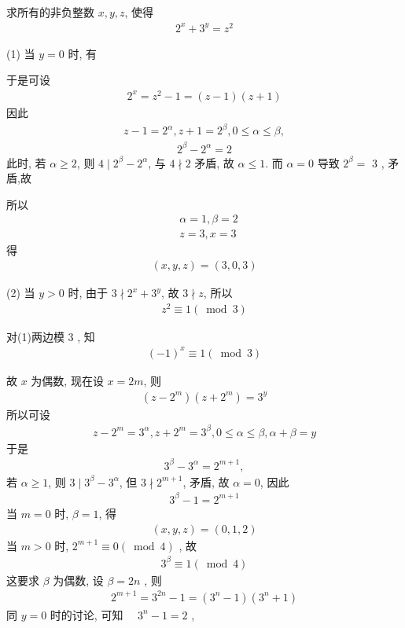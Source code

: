 \begin{example}
	求所有的非负整数 $x ,  y ,  z$, 使得
	\begin{align*}
		2^{x}+3^{y}=z^{2}
	\end{align*}
\end{example}
\begin{solution}
	(1) 当 $y=0$ 时, 有

	于是可设
	\begin{align*}
		2^{x}=z^{2}-1=(z-1)(z+1)
	\end{align*}
	因此
	\begin{align*}
		z-1=2^{\alpha}, z+1=2^{\beta}, 0 \leqslant \alpha \leqslant \beta,
	\end{align*}
	\begin{align*}
		2^{\beta}-2^{\alpha}=2
	\end{align*}
	此时, 若 $\alpha \geqslant 2$, 则 $4 \mid 2^{\beta}-2^{\alpha}$, 与 $4 \nmid 2$ 矛盾, 故 $\alpha \leqslant 1$. 而 $\alpha=0$ 导致 $2^{\beta}=$ 3 , 矛盾,故

	所以
	\begin{align}
		 & \alpha=1, \beta=2 \\
		 & z=3, x=3
	\end{align}
	得
	\begin{align*}
		(x, y, z)=(3,0,3)
	\end{align*}

	(2) 当 $y>0$ 时, 由于 $3 \nmid 2^{x}+3^{y}$, 故 $3 \nmid z$, 所以
	\begin{align*}
		z^{2} \equiv 1(\bmod 3)
	\end{align*}

	对(1)两边模 3 , 知
	\begin{align*}
		(-1)^{x} \equiv 1(\bmod 3)
	\end{align*}

	故 $x$ 为偶数, 现在设 $x=2 m$, 则
	\begin{align*}
		\left(z-2^{m}\right)\left(z+2^{m}\right)=3^{y}
	\end{align*}
	所以可设
	\begin{align*}
		z-2^{m}=3^{\alpha}, z+2^{m}=3^{\beta}, 0 \leqslant \alpha \leqslant \beta, \alpha+\beta=y
	\end{align*}
	于是
	\begin{align*}
		3^{\beta}-3^{\alpha}=2^{m+1},
	\end{align*}
	若 $\alpha \geqslant 1$, 则 $3 \mid 3^{\beta}-3^{\alpha}$, 但 $3 \nmid 2^{m+1}$, 矛盾, 故 $\alpha=0$, 因此
	\begin{align*}
		3^{\beta}-1=2^{m+1}
	\end{align*}
	当 $m=0$ 时, $\beta=1$, 得
	\begin{align*}
		(x, y, z)=(0,1,2)
	\end{align*}
	当 $m>0$ 时, $2^{m+1} \equiv 0(\bmod 4)$ , 故
	\begin{align*}
		3^{\beta} \equiv 1(\bmod 4)
	\end{align*}
	这要求 $\beta$ 为偶数, 设 $\beta=2 n$ , 则
	\begin{align*}
		2^{m+1}=3^{2 n}-1=\left(3^{n}-1\right)\left(3^{n}+1\right)
	\end{align*}
	同 $y=0$ 时的讨论, 可知 $\quad 3^{n}-1=2$ ,


\end{solution}
